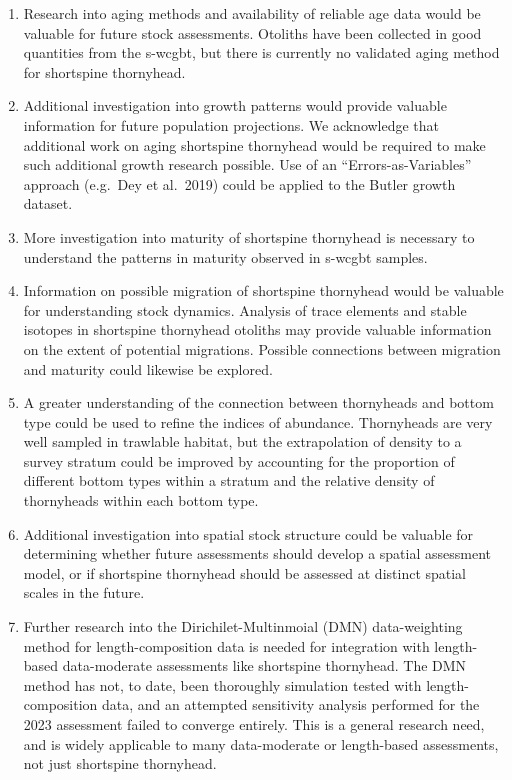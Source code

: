 \documentclass[11pt,
  english,
  letterpaper,
]{article}
\providecommand{\tightlist}{%
  \setlength{\itemsep}{0pt}\setlength{\parskip}{0pt}}
\providecommand{\tightlist}{%
  \setlength{\itemsep}{0pt}\setlength{\parskip}{0pt}}
\begin{document}
\begin{enumerate}
\def\labelenumi{\arabic{enumi}.}
\tightlist
\item
  Research into aging methods and availability of reliable age data would be valuable for future stock assessments. Otoliths have been collected in good quantities from the \gls{s-wcgbt}, but there is currently no validated aging method for shortspine thornyhead.
\item
  Additional investigation into growth patterns would provide valuable information for future population projections. We acknowledge that additional work on aging shortspine thornyhead would be required to make such additional growth research possible. Use of an ``Errors-as-Variables'' approach (e.g.~Dey et al.~2019) could be applied to the Butler growth dataset.
\item
  More investigation into maturity of shortspine thornyhead is necessary to understand the patterns in maturity observed in \gls{s-wcgbt} samples.
\item
  Information on possible migration of shortspine thornyhead would be valuable for understanding stock dynamics. Analysis of trace elements and stable isotopes in shortspine thornyhead otoliths may provide valuable information on the extent of potential migrations. Possible connections between migration and maturity could likewise be explored.
\item
  A greater understanding of the connection between thornyheads and bottom type could be used to refine the indices of abundance. Thornyheads are very well sampled in trawlable habitat, but the extrapolation of density to a survey stratum could be improved by accounting for the proportion of different bottom types within a stratum and the relative density of thornyheads within each bottom type.
\item
  Additional investigation into spatial stock structure could be valuable for determining whether future assessments should develop a spatial assessment model, or if shortspine thornyhead should be assessed at distinct spatial scales in the future.
\item
  Further research into the Dirichilet-Multinmoial (DMN) data-weighting method for length-composition data is needed for integration with length-based data-moderate assessments like shortspine thornyhead. The DMN method has not, to date, been thoroughly simulation tested with length-composition data, and an attempted sensitivity analysis performed for the 2023 assessment failed to converge entirely. This is a general research need, and is widely applicable to many data-moderate or length-based assessments, not just shortspine thornyhead.
\end{enumerate}
\end{document}
